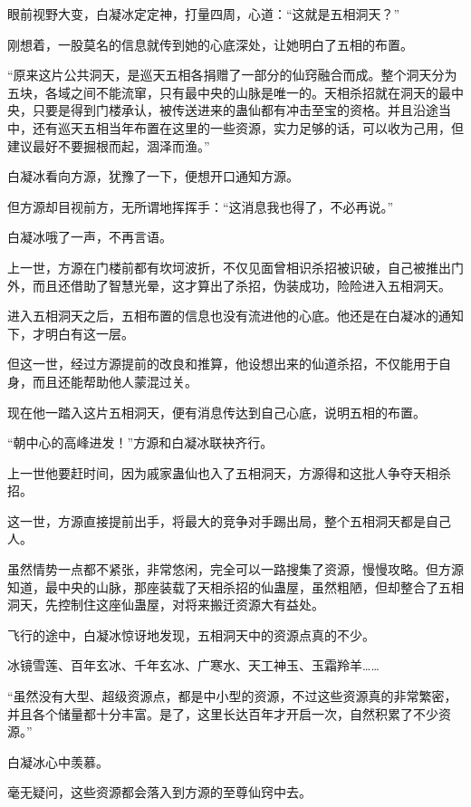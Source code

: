 
\begin{this_body}

眼前视野大变，白凝冰定定神，打量四周，心道：“这就是五相洞天？”

刚想着，一股莫名的信息就传到她的心底深处，让她明白了五相的布置。

“原来这片公共洞天，是巡天五相各捐赠了一部分的仙窍融合而成。整个洞天分为五块，各域之间不能流窜，只有最中央的山脉是唯一的。天相杀招就在洞天的最中央，只要是得到门楼承认，被传送进来的蛊仙都有冲击至宝的资格。并且沿途当中，还有巡天五相当年布置在这里的一些资源，实力足够的话，可以收为己用，但建议最好不要掘根而起，涸泽而渔。”

白凝冰看向方源，犹豫了一下，便想开口通知方源。

但方源却目视前方，无所谓地挥挥手：“这消息我也得了，不必再说。”

白凝冰哦了一声，不再言语。

上一世，方源在门楼前都有坎坷波折，不仅见面曾相识杀招被识破，自己被推出门外，而且还借助了智慧光晕，这才算出了杀招，伪装成功，险险进入五相洞天。

进入五相洞天之后，五相布置的信息也没有流进他的心底。他还是在白凝冰的通知下，才明白有这一层。

但这一世，经过方源提前的改良和推算，他设想出来的仙道杀招，不仅能用于自身，而且还能帮助他人蒙混过关。

现在他一踏入这片五相洞天，便有消息传达到自己心底，说明五相的布置。

“朝中心的高峰进发！”方源和白凝冰联袂齐行。

上一世他要赶时间，因为戚家蛊仙也入了五相洞天，方源得和这批人争夺天相杀招。

这一世，方源直接提前出手，将最大的竞争对手踢出局，整个五相洞天都是自己人。

虽然情势一点都不紧张，非常悠闲，完全可以一路搜集了资源，慢慢攻略。但方源知道，最中央的山脉，那座装载了天相杀招的仙蛊屋，虽然粗陋，但却整合了五相洞天，先控制住这座仙蛊屋，对将来搬迁资源大有益处。

飞行的途中，白凝冰惊讶地发现，五相洞天中的资源点真的不少。

冰镜雪莲、百年玄冰、千年玄冰、广寒水、天工神玉、玉霜羚羊……

“虽然没有大型、超级资源点，都是中小型的资源，不过这些资源真的非常繁密，并且各个储量都十分丰富。是了，这里长达百年才开启一次，自然积累了不少资源。”

白凝冰心中羡慕。

毫无疑问，这些资源都会落入到方源的至尊仙窍中去。


\end{this_body}
